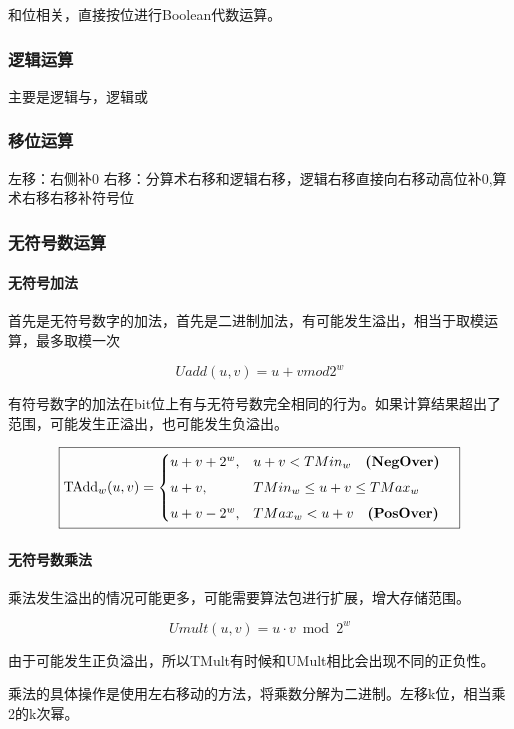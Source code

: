 和位相关，直接按位进行Boolean代数运算。

\subsubsection{逻辑运算}

主要是逻辑与，逻辑或

\subsubsection{移位运算}

左移：右侧补0
右移：分算术右移和逻辑右移，逻辑右移直接向右移动高位补0,算术右移右移补符号位

\subsubsection{无符号数运算}

\paragraph{无符号加法}
首先是无符号数字的加法，首先是二进制加法，有可能发生溢出，相当于取模运算，最多取模一次

\[
Uadd(u, v) = u + v mod 2^w
\]

有符号数字的加法在bit位上有与无符号数完全相同的行为。如果计算结果超出了范围，可能发生正溢出，也可能发生负溢出。

\[
\boxed{
\begin{aligned}
\operatorname{TAdd}_w(u,v)
&=
\begin{cases}
u+v+2^w, & u+v<TMin_w \quad \text{\textbf{(NegOver)}} \\[4pt]
u+v, & TMin_w\le u+v\le TMax_w \\[4pt]
u+v-2^w, & TMax_w<u+v \quad \text{\textbf{(PosOver)}}
\end{cases}
\end{aligned}
}
\]

\paragraph{无符号数乘法}

乘法发生溢出的情况可能更多，可能需要算法包进行扩展，增大存储范围。

\[
Umult(u, v) = u \cdot v \bmod 2^w
\]

由于可能发生正负溢出，所以TMult有时候和UMult相比会出现不同的正负性。

乘法的具体操作是使用左右移动的方法，将乘数分解为二进制。左移k位，相当乘2的k次幂。


